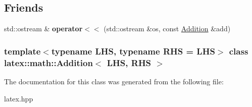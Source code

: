 \subsection*{\-Friends}
\begin{DoxyCompactItemize}
\item 
\hypertarget{classlatex_1_1math_1_1Addition_a4d362127264a2ef4b53edb9c7a983b18}{std\-::ostream \& {\bfseries operator$<$$<$} (std\-::ostream \&os, const \hyperlink{classlatex_1_1math_1_1Addition}{\-Addition} \&add)}\label{classlatex_1_1math_1_1Addition_a4d362127264a2ef4b53edb9c7a983b18}

\end{DoxyCompactItemize}
\subsubsection*{template$<$typename \-L\-H\-S, typename \-R\-H\-S = \-L\-H\-S$>$ class latex\-::math\-::\-Addition$<$ L\-H\-S, R\-H\-S $>$}



\-The documentation for this class was generated from the following file\-:\begin{DoxyCompactItemize}
\item 
latex.\-hpp\end{DoxyCompactItemize}
